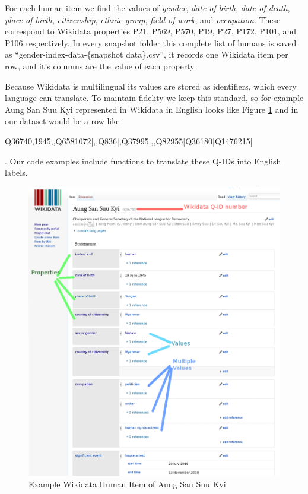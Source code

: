\documentclass[letterpaper]{article}
\begin{document}
For each human item we find the values of \textit{gender}, \textit{date of birth}, \textit{date of death}, \textit{place of birth}, \textit{citizenship}, \textit{ethnic group}, \textit{field of work}, and \textit{occupation}. These correspond to Wikidata properties P21, P569, P570, P19, P27, P172, P101, and P106 respectively.  In every snapshot folder this complete list of humans is saved as ``gender-index-data-\{snapshot data\}.csv'', it records one Wikidata item per row, and it's columns are the value of each property. 

Because Wikidata is multilingual its values are stored as identifiers, which every language can translate. To maintain fidelity we keep this standard, so for example Aung San Suu Kyi represented in Wikidata in English looks like Figure \ref{fig:aung} and in our dataset would be a row like \begin{small} Q36740,1945,,Q6581072|,,Q836|,Q37995|,,Q82955|Q36180|Q1476215|
\end{small}. Our code examples include functions to translate these Q-IDs into English labels.

\begin{figure}
\includegraphics[scale=0.15]{figures/aung_explainer.png} 
\caption{Example Wikidata Human Item of Aung San Suu Kyi}
\label{fig:aung}
\end{figure}
 
\end{document}
